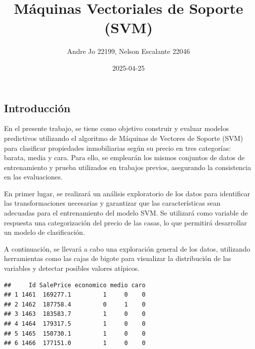 \documentclass[
]{article}
\title{Máquinas Vectoriales de Soporte (SVM)}
\author{Andre Jo 22199, Nelson Escalante 22046}
\date{2025-04-25}
\begin{document}
\maketitle

\subsection{Introducción}\label{introducciuxf3n}

En el presente trabajo, se tiene como objetivo construir y evaluar
modelos predictivos utilizando el algoritmo de Máquinas de Vectores de
Soporte (SVM) para clasificar propiedades inmobiliarias según su precio
en tres categorías: barata, media y cara. Para ello, se emplearán los
mismos conjuntos de datos de entrenamiento y prueba utilizados en
trabajos previos, asegurando la consistencia en las evaluaciones.

En primer lugar, se realizará un análisis exploratorio de los datos para
identificar las transformaciones necesarias y garantizar que las
características sean adecuadas para el entrenamiento del modelo SVM. Se
utilizará como variable de respuesta una categorización del precio de
las casas, lo que permitirá desarrollar un modelo de clasificación.

A continuación, se llevará a cabo una exploración general de los datos,
utilizando herramientas como las cajas de bigote para visualizar la
distribución de las variables y detectar posibles valores atípicos.

\begin{verbatim}
##     Id SalePrice economico medio caro
## 1 1461  169277.1         1     0    0
## 2 1462  187758.4         0     1    0
## 3 1463  183583.7         1     0    0
## 4 1464  179317.5         1     0    0
## 5 1465  150730.1         1     0    0
## 6 1466  177151.0         1     0    0
\end{verbatim}
\end{document}
